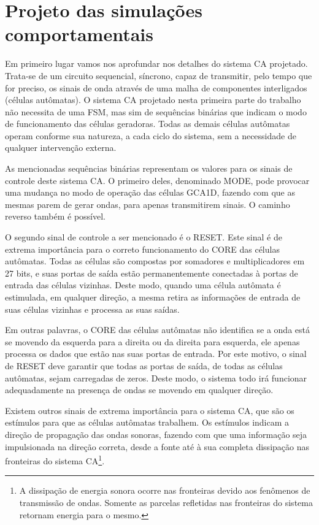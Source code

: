 \chapter[Projeto das simulações comportamentais]{Projeto das simulações comportamentais}

Em primeiro lugar vamos nos aprofundar nos detalhes do sistema CA projetado. Trata-se de um circuito sequencial, síncrono, capaz de transmitir, pelo tempo que for preciso, os sinais de onda através de uma malha de componentes interligados (células autômatas). O sistema CA projetado nesta primeira parte do trabalho não necessita de uma FSM, mas sim de sequências binárias que indicam o modo de funcionamento das células geradoras. Todas as demais células autômatas operam conforme sua natureza, a cada ciclo do sistema, sem a necessidade de qualquer intervenção externa.

As mencionadas sequências binárias representam os valores para os sinais de controle deste sistema CA. O primeiro deles, denominado MODE, pode provocar uma mudança no modo de operação das células GCA1D, fazendo com que as mesmas parem de gerar ondas, para apenas transmitirem sinais. O caminho reverso também é possível.

O segundo sinal de controle a ser mencionado é o RESET. Este sinal é de extrema importância para o correto funcionamento do CORE das células autômatas. Todas as células são compostas por somadores e multiplicadores em 27 bits, e suas portas de saída estão permanentemente conectadas à portas de entrada das células vizinhas. Deste modo, quando uma célula autômata é estimulada, em qualquer direção, a mesma retira as informações de entrada de suas células vizinhas e processa as suas saídas.

Em outras palavras, o CORE das células autômatas não identifica se a onda está se movendo da esquerda para a direita ou da direita para esquerda, ele apenas processa os dados que estão nas suas portas de entrada. Por este motivo, o sinal de RESET deve garantir que todas as portas de saída, de todas as células autômatas, sejam carregadas de zeros. Deste modo, o sistema todo irá funcionar adequadamente na presença de ondas se movendo em qualquer direção.

Existem outros sinais de extrema importância para o sistema CA, que são os estímulos para que as células autômatas trabalhem. Os estímulos indicam a direção de propagação das ondas sonoras, fazendo com que uma informação seja impulsionada na direção correta, desde a fonte até à sua completa dissipação nas fronteiras do sistema CA\footnote{A dissipação de energia sonora ocorre nas fronteiras devido aos fenômenos de transmissão de ondas. Somente as parcelas refletidas nas fronteiras do sistema retornam energia para o mesmo.}.

